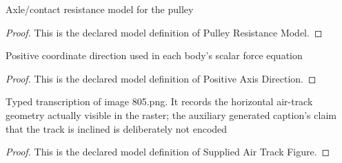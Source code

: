 \begin{definition}
  \label{def:physics:phyx-mini-0805:phyxminiproblems-problemphyxmini0805-pulleyresistancemodel}
  Axle/contact resistance model for the pulley
\end{definition}
\begin{proof}
  This is the declared model definition of Pulley Resistance Model.
\end{proof}
\begin{definition}
  \label{def:physics:phyx-mini-0805:phyxminiproblems-problemphyxmini0805-positiveaxisdirection}
  Positive coordinate direction used in each body's scalar force equation
\end{definition}
\begin{proof}
  This is the declared model definition of Positive Axis Direction.
\end{proof}
\begin{definition}
  \label{def:physics:phyx-mini-0805:phyxminiproblems-problemphyxmini0805-suppliedairtrackfigure}
  Typed transcription of image 805.png. It records the horizontal air-track geometry actually visible in the raster; the auxiliary generated caption's claim that the track is inclined is deliberately not encoded
\end{definition}
\begin{proof}
  This is the declared model definition of Supplied Air Track Figure.
\end{proof}
